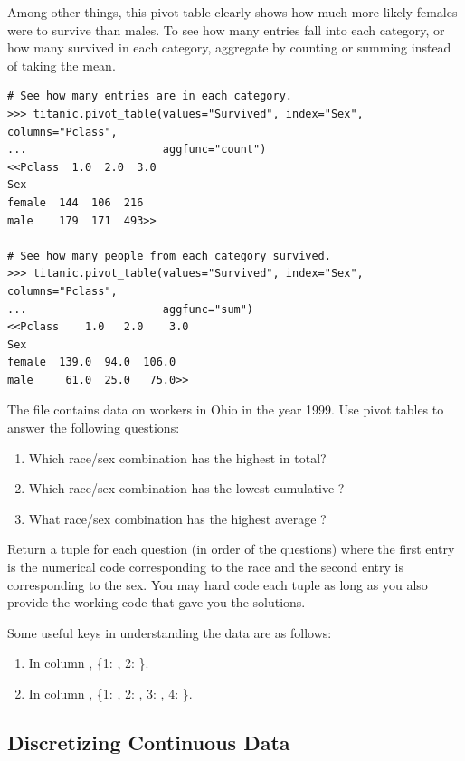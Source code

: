 Among other things, this pivot table clearly shows how much more likely females were to survive than males.
To see how many entries fall into each category, or how many survived in each category, aggregate by counting or summing instead of taking the mean.

\begin{lstlisting}
# See how many entries are in each category.
>>> titanic.pivot_table(values="Survived", index="Sex", columns="Pclass",
...                     aggfunc="count")
<<Pclass  1.0  2.0  3.0
Sex
female  144  106  216
male    179  171  493>>

# See how many people from each category survived.
>>> titanic.pivot_table(values="Survived", index="Sex", columns="Pclass",
...                     aggfunc="sum")
<<Pclass    1.0   2.0    3.0
Sex
female  139.0  94.0  106.0
male     61.0  25.0   75.0>>
\end{lstlisting}

\begin{problem}
The file  contains data on workers in Ohio in the year 1999.
Use pivot tables to answer the following questions:

\begin{enumerate}
\item Which race/sex combination has the highest  in total?
\item Which race/sex combination has the lowest cumulative ?
\item What race/sex combination has the highest average ?
\end{enumerate}

Return a tuple for each question (in order of the questions) where the first entry is the numerical code corresponding to the race and the second entry is corresponding to the sex. You may hard code each tuple as long as you also provide the working code that gave you the solutions.


Some useful keys in understanding the data are as follows:
\begin{enumerate}
\item In column , \{1: , 2: \}.
\item In column , \{1: , 2: , 3: , 4: \}.
\end{enumerate}
\end{problem}

\subsection*{Discretizing Continuous Data} %

